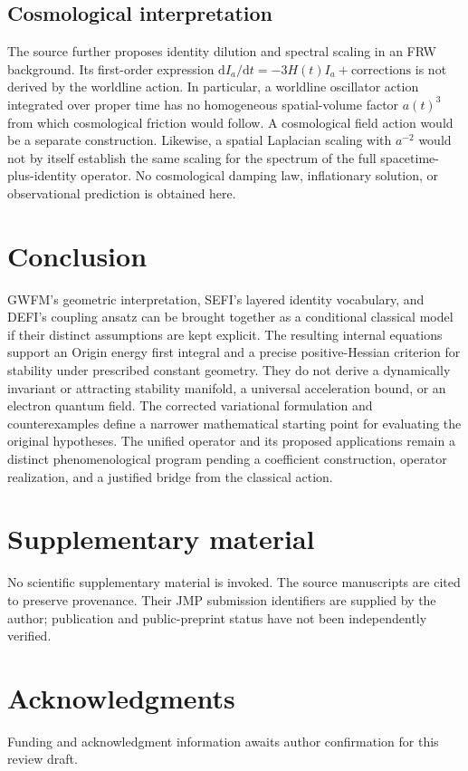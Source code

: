 \documentclass[aip,jmp,reprint,onecolumn,amsmath,amssymb]{revtex4-2}
\newcommand{\dd}{\mathrm{d}}
\begin{document}
\subsection{Cosmological interpretation}
The source further proposes identity dilution and spectral scaling in an FRW background.\cite{unified} Its first-order expression $\dd I_a/\dd t=-3H(t)I_a+\text{corrections}$ is not derived by the worldline action. In particular, a worldline oscillator action integrated over proper time has no homogeneous spatial-volume factor $a(t)^3$ from which cosmological friction would follow. A cosmological field action would be a separate construction. Likewise, a spatial Laplacian scaling with $a^{-2}$ would not by itself establish the same scaling for the spectrum of the full spacetime-plus-identity operator. No cosmological damping law, inflationary solution, or observational prediction is obtained here.

\section{Conclusion}
GWFM's geometric interpretation, SEFI's layered identity vocabulary, and DEFI's coupling ansatz can be brought together as a conditional classical model if their distinct assumptions are kept explicit. The resulting internal equations support an Origin energy first integral and a precise positive-Hessian criterion for stability under prescribed constant geometry. They do not derive a dynamically invariant or attracting stability manifold, a universal acceleration bound, or an electron quantum field. The corrected variational formulation and counterexamples define a narrower mathematical starting point for evaluating the original hypotheses. The unified operator and its proposed applications remain a distinct phenomenological program pending a coefficient construction, operator realization, and a justified bridge from the classical action.

\section*{Supplementary material}
No scientific supplementary material is invoked. The source manuscripts are cited to preserve provenance. Their JMP submission identifiers are supplied by the author; publication and public-preprint status have not been independently verified.
\section*{Acknowledgments}
Funding and acknowledgment information awaits author confirmation for this review draft.
\end{document}
